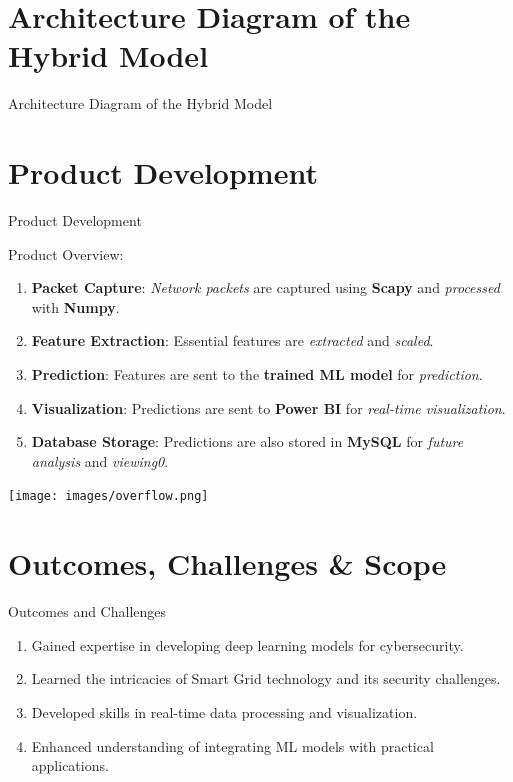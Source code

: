 \documentclass{beamer}
\begin{document}
\section{Architecture Diagram of the Hybrid Model}

\begin{frame}{Architecture Diagram of the Hybrid Model}
\end{frame}

\section{Product Development}
\begin{frame}{Product Development}
\begin{minipage}{0.6\textwidth}
    Product Overview:
    \begin{enumerate}
        \item \textbf{Packet Capture}: \textit{Network packets} are captured using \textbf{Scapy} and \textit{processed} with \textbf{Numpy}.
        \item \textbf{Feature Extraction}: Essential features are \textit{extracted} and \textit{scaled}.
        \item \textbf{Prediction}: Features are sent to the \textbf{trained ML model} for \textit{prediction}.
        \item \textbf{Visualization}: Predictions are sent to \textbf{Power BI} for \textit{real-time visualization}.
        \item \textbf{Database Storage}: Predictions are also stored in \textbf{MySQL} for \textit{future analysis} and \textit{viewing0}.
    \end{enumerate}
\end{minipage}%
\begin{minipage}{0.4\textwidth}
\texttt{[image: images/overflow.png]}
\end{minipage}
\end{frame}

\section{Outcomes, Challenges \& Scope}

\begin{frame}{Outcomes and Challenges}
    \begin{enumerate}
        \item Gained expertise in developing deep learning models for cybersecurity.
        \item Learned the intricacies of Smart Grid technology and its security challenges.
        \item Developed skills in real-time data processing and visualization.
        \item Enhanced understanding of integrating ML models with practical applications.
    \end{enumerate}
\end{frame}
\end{document}
